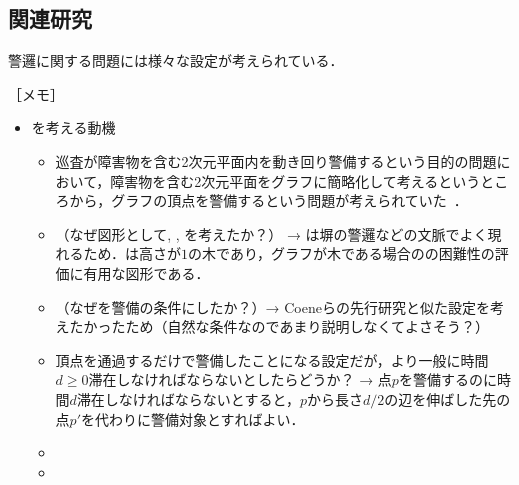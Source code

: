 \subsection*{関連研究}
警邏に関する問題には様々な設定が考えられている．

［メモ］
\begin{itemize}
  \item {\patProb}を考える動機
  \begin{itemize}
    \item 巡査が障害物を含む2次元平面内を動き回り警備するという目的の問題において，障害物を含む2次元平面をグラフに簡略化して考えるというところから，グラフの頂点を警備するという問題が考えられていた~\cite{machado2002multi}．
    \item （なぜ図形として{\graphLine}, {\graphStar}, {\graphUnit}を考えたか？） → {\graphLine}は塀の警邏などの文脈でよく現れるため．{\graphStar}は高さが$1$の木であり，グラフが木である場合の{\patProb}の困難性の評価に有用な図形である．
    \item （なぜ{\maxIdletime}を警備の条件にしたか？）→ Coeneらの先行研究と似た設定を考えたかったため（自然な条件なのであまり説明しなくてよさそう？）
    \item 頂点を通過するだけで警備したことになる設定だが，より一般に時間$d \geq 0$滞在しなければならないとしたらどうか？ → 点$p$を警備するのに時間$d$滞在しなければならないとすると，$p$から長さ$d/2$の辺を伸ばした先の点$p'$を代わりに警備対象とすればよい．
    \item 
    \item 
  \end{itemize}


\end{itemize}
